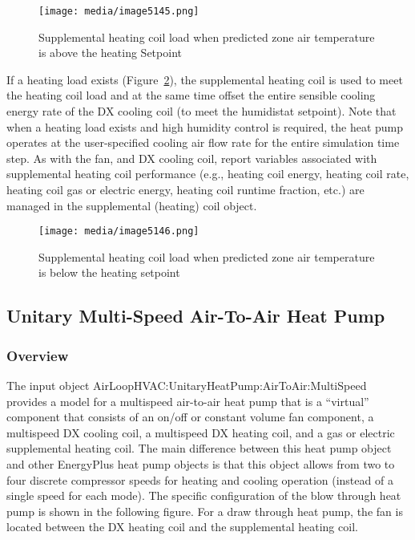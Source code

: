 \begin{figure}[hbtp] %
\centering
\texttt{[image: media/image5145.png]}
\caption{Supplemental heating coil load when predicted zone air temperature is above the heating Setpoint \protect \label{fig:supplemental-heating-coil-load-when-predicted-002}}
\end{figure}

If a heating load exists (Figure~\ref{fig:supplemental-heating-coil-load-when-predicted-003}), the supplemental heating coil is used to meet the heating coil load and at the same time offset the entire sensible cooling energy rate of the DX cooling coil (to meet the humidistat setpoint). Note that when a heating load exists and high humidity control is required, the heat pump operates at the user-specified cooling air flow rate for the entire simulation time step. As with the fan, and DX cooling coil, report variables associated with supplemental heating coil performance (e.g., heating coil energy, heating coil rate, heating coil gas or electric energy, heating coil runtime fraction, etc.) are managed in the supplemental (heating) coil object.

\begin{figure}[hbtp] %
\centering
\texttt{[image: media/image5146.png]}
\caption{Supplemental heating coil load when predicted zone air temperature is below the heating setpoint \protect \label{fig:supplemental-heating-coil-load-when-predicted-003}}
\end{figure}

\subsection{Unitary Multi-Speed Air-To-Air Heat Pump}\label{unitary-multi-speed-air-to-air-heat-pump}

\subsubsection{Overview}\label{overview-4}

The input object AirLoopHVAC:UnitaryHeatPump:AirToAir:MultiSpeed provides a model for a multispeed air-to-air heat pump that is a ``virtual'' component that consists of an on/off or constant volume fan component, a multispeed DX cooling coil, a multispeed DX heating coil, and a gas or electric supplemental heating coil. The main difference between this heat pump object and other EnergyPlus heat pump objects is that this object allows from two to four discrete compressor speeds for heating and cooling operation (instead of a single speed for each mode). The specific configuration of the blow through heat pump is shown in the following figure. For a draw through heat pump, the fan is located between the DX heating coil and the supplemental heating coil.

